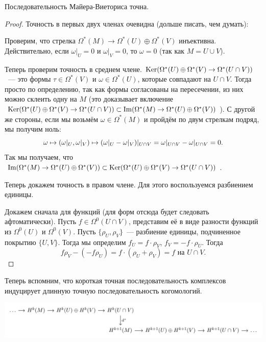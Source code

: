  	  \begin{lemma} 
 	  	Последовательность Майера-Виеториса точна. 
 	  \end{lemma}
 	  \begin{proof}
 	  	Точность в первых двух членах очевидна (дольше писать, чем думать): 

 	  	 Проверим, что стрелка $\Omega^*(M) \to \Omega^*(U) \oplus \Omega^*(V)$ инъективна. Действительно, если $\omega\vert_{U} = 0$ и $\omega\vert_{V} = 0$, то $\omega = 0$ (так как $M = U \cup V$). 

 	  	 Теперь проверим точность в среднем члене. $\Ker\lr*{\Omega^*(U) \oplus \Omega^*(V) \to \Omega^*(U \cap V)} $~--- это формы $\tau \in \Omega^*(V)$ и $\omega \in \Omega^*(U)$, которые совпадают на $U \cap V$. Тогда просто по определению, так как формы согласованы на пересечении, из них можно склеить одну на $M$ (это доказывает включение $\Ker\lr*{\Omega^*(U) \oplus \Omega^*(V) \to \Omega^*(U \cap V)}  \subset \Im\lr*{ \Omega^*(M)  \to \Omega^*(U) \oplus \Omega^*(V)}$). С другой же стороны, если мы возьмём $\omega \in \Omega^*(M)$ и пройдём по двум стрелкам подряд, мы получим ноль: 
 	  	 \[
 	  	 	\omega \mapsto (\omega\vert_U, \omega\vert_V) \mapsto \lr*{\omega\vert_U - \omega\vert_V}\vert_{U \cap V} = \omega\vert_{U \cap V} - \omega\vert_{U \cap V} = 0. 
 	  	 \]
 	  	 Так мы получаем, что $\Im\lr*{ \Omega^*(M)  \to \Omega^*(U) \oplus \Omega^*(V)} \subset \Ker\lr*{\Omega^*(U) \oplus \Omega^*(V) \to \Omega^*(U \cap V)}$. 

 	  	 Теперь докажем точность в правом члене. Для этого воспользуемся разбиением единицы. 

 	  	 Докажем сначала для функций (для форм отсюда будет следовать афтоматически). Пусть $f \in \Omega^0(U \cap V)$, представим её в виде разности функций из $\Omega^0(U)$ и $\Omega^0(V)$. Пусть $\{ \rho_U, \rho_V \}$~--- разбиение единицы, подчиненное покрытию $\{ U, V \}$. Тогда мы определим $f_U = f \cdot \rho_V$, $f_V = - f \cdot \rho_U$. Тогда 
 	  	 \[
 	  	 	f \rho_V - (-f \rho_U) = f \cdot (\rho_U + \rho _V) = f \text{ на } U \cap V. 
 	  	 \]

 	  	 
 	  \end{proof}

 	  Теперь вспомним, что короткая точная последовательность комплексов индуцирует длинную точную последовательность когомологий. 

 	  \begin{center}
 	  		\includegraphics{lectures/7/pictures/cd_8.pdf}
 	  \end{center}

